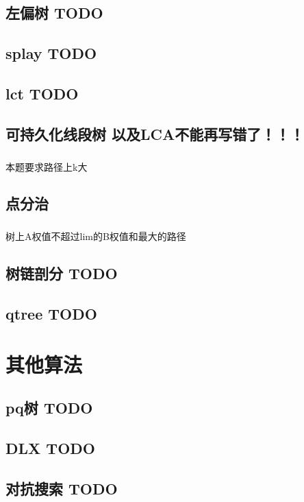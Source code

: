 \documentclass[landscape]{report}
\newcommand{\includecode}[2][c]{}
\begin{document}
\begin{flushleft}
\begin{multicols}{2}
\section{ 左偏树 TODO}
\section{splay TODO}
\section{lct TODO}
\section{可持久化线段树 以及LCA不能再写错了！！！}
\paragraph{ }
本题要求路径上k大
\includecode[c++]{COT.cpp}
\section{ 点分治}
\includecode[c++]{poj1741.cpp}
\paragraph{ }
树上A权值不超过lim的B权值和最大的路径
\includecode[c++]{poj1741.cpp}

\section{ 树链剖分 TODO}
\section{ qtree TODO}


\chapter{ 其他算法}
\section{pq树 TODO}
\section{ DLX TODO}
\section{ 对抗搜索 TODO}

\end{multicols}
\end{flushleft}
\end{document}

